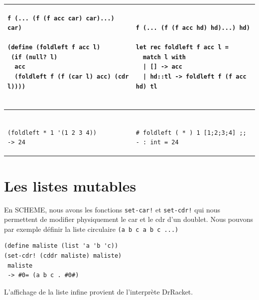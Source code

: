 \documentclass[11pt]{book}
\begin{document}
\begin{footnotesize}
\begin{tabular}{l|l}
\begin{minipage}{2.8in}
\begin{Verbatim}
f (... (f (f acc car) car)...) car)

(define (foldleft f acc l)
 (if (null? l)
  acc
  (foldleft f (f (car l) acc) (cdr l))))
  
\end{Verbatim}
\end{minipage}
&
\begin{minipage}{2.8in}
\begin{Verbatim}

f (... (f (f acc hd) hd)...) hd)

let rec foldleft f acc l =
  match l with
  | [] -> acc
  | hd::tl -> foldleft f (f acc hd) tl
  
\end{Verbatim}
\end{minipage} \\ \hline
\begin{minipage}{2.8in}
\begin{Verbatim}

(foldleft * 1 '(1 2 3 4))
-> 24

\end{Verbatim}
\end{minipage}
&
\begin{minipage}{3.0in}
\begin{Verbatim}

# foldleft ( * ) 1 [1;2;3;4] ;;
- : int = 24

\end{Verbatim}
\end{minipage} 

\end{tabular}

\end{footnotesize}
\section{Les listes mutables}

En SCHEME, nous avons les fonctions \verb+set-car!+ et \verb+set-cdr!+ qui nous permettent de modifier physiquement
 le car et le cdr d'un doublet.
Nous pouvons par exemple définir la liste circulaire \verb+(a b c a b c ...)+
\begin{Verbatim}
(define maliste (list 'a 'b 'c))
(set-cdr! (cddr maliste) maliste)
 maliste
 -> #0= (a b c . #0#)
\end{Verbatim}
L'affichage de la liste infine provient de l'interprète DrRacket.
\end{document}
